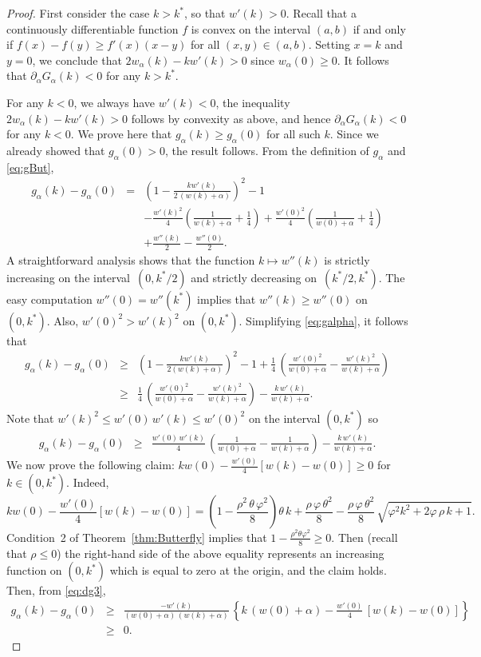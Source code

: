 \documentclass[12pt]{article}
\numberwithin{equation}{section}
\newcommand{\beas}{\begin{eqnarray*}}
\newcommand{\eeas}{\end{eqnarray*}}
\newcommand{\bea}{\begin{eqnarray}}
\newcommand{\eea}{\end{eqnarray}}
\begin{document}
\begin{proof}
First consider the case $k>k^*$, so that $w'(k)>0$.  
Recall that a continuously differentiable function $f$ is convex on the interval $(a,b)$ if and only if
$f(x)-f(y)\geq f'(x)(x-y)$ for all $(x,y)\in (a,b)$.
Setting $x=k$ and $y=0$, we conclude that $2w_\alpha(k)-kw'(k)>0$ since $w_\alpha(0)\geq 0$.  It follows that $\partial_\alpha G_\alpha(k)<0$ for any $k>k^*$.

For any $k<0$, we always have $w'(k)<0$, the inequality $2w_\alpha(k)-kw'(k)>0$ follows by convexity as above, and hence
$\partial_\alpha G_\alpha(k)<0$ for any $k<0$.
We prove here that $g_\alpha(k)\geq g_\alpha(0)$ for all such $k$.
Since we already showed that $g_\alpha(0)>0$, the result follows.
From the definition of $g_\alpha$ and \eqref{eq:gBut},
\bea
g_\alpha(k)-g_\alpha(0)&=&\left(1-\frac{k w'(k)}{2 \,(w(k)+\alpha)}\right)^2-1\nonumber\\
&&-\frac{w'(k)^2}{4}\left(\frac{1}{w(k)+\alpha}+\frac{1}{4} \right) + \frac{w'(0)^2}{4}\left(\frac{1}{w(0)+\alpha}+\frac{1}{4} \right)\nonumber\\
&&+\frac{w''(k)}{2}-\frac{w''(0)}{2}.
\label{eq:galpha}
\eea
A straightforward analysis shows that the function $k\mapsto w''(k)$ is strictly increasing on the interval~$\left(0,k^*/2\right)$ and strictly decreasing on~$\left(k^*/2,k^*\right)$.  The easy computation $w''(0)=w''(k^*)$ implies that $w''(k)\geq w''(0)$ on $\left(0,k^*\right)$. Also, $w'(0)^2 > w'(k)^2$ on $(0,k^*)$.  Simplifying \eqref{eq:galpha}, it follows that
\beas
g_\alpha(k)-g_\alpha(0)&\geq&\left(1-\frac{k w'(k)}{2(w(k)+\alpha)}\right)^2-1
+ \frac{1}{4}\,\left(\frac{w'(0)^2}{w(0)+\alpha}-\frac{w'(k)^2}{w(k)+\alpha} \right)\nonumber \\
&\geq&\frac{1}{4}\,\left(\frac{w'(0)^2}{w(0)+\alpha}-\frac{w'(k)^2}{w(k)+\alpha} \right) 
-\frac{k\, w'(k)}{w(k)+\alpha}.
\label{eq:dg2}
\eeas
Note that $w'(k)^2 \leq w'(0)\,w'(k) \leq w'(0)^2$ on the interval $(0, k^*)$ so
\bea
g_\alpha(k)-g_\alpha(0)
&\geq&\frac{w'(0)\,w'(k)}{4}\,\left(\frac{1}{w(0)+\alpha}-\frac{1}{w(k)+\alpha} \right) 
-\frac{k\, w'(k)}{w(k)+\alpha}.
\label{eq:dg3}
\eea
We now prove the following claim:
$k w(0) - \frac{w'(0)}{4}[w(k)-w(0)] \geq 0$ for $k\in (0,k^*)$.
Indeed, 
$$
k w(0) - \frac{ w'(0)}{4}[w(k)-w(0)]
 = \left(1-\frac{\rho^2\,\theta\,\varphi^2}{8}\right)\theta \,k + \frac{\rho\, \varphi\,\theta^2}{8}
-\frac{\rho\, \varphi \,\theta^2}{8}\,\sqrt{\varphi^2 k^2 + 2\varphi\, \rho\, k +1}.
$$
Condition~2 of Theorem~\ref{thm:Butterfly} implies that $1-\frac{\rho^2\theta\varphi^2}{8}\geq 0$.
Then (recall that $\rho\leq 0$) the right-hand side of the above equality represents an increasing function on $(0,k^*)$ which is equal to zero at the origin, and the claim holds.
Then, from \eqref{eq:dg3},
\beas
g_\alpha(k)-g_\alpha(0)
&\geq&\frac{-w'(k)}{(w(0)+\alpha)\,(w(k)+\alpha)}\,\left\{k\, (w(0)+\alpha) - \frac{w'(0)}{4}\,\left[ w(k)-w(0) \right]
\right\}\\
&\geq& 0.
\eeas
\end{proof}
\end{document}
